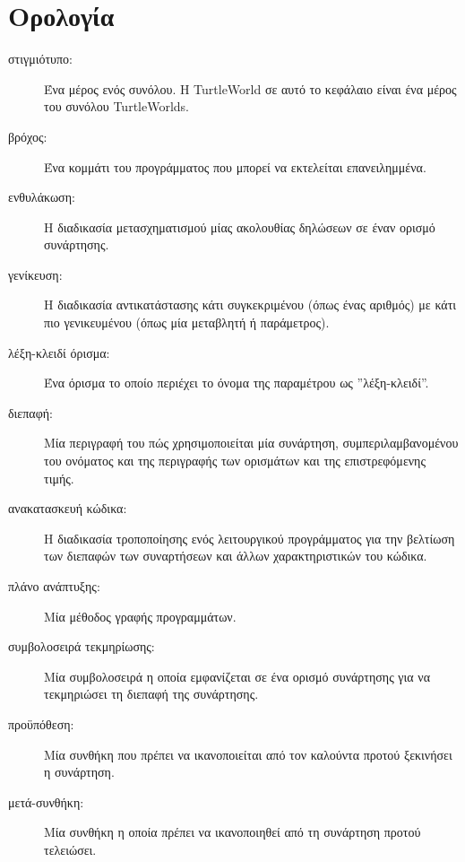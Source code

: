 \documentclass[10pt]{book}
\begin{document}
\section{Ορολογία}

\begin{description}

\item[στιγμιότυπο:] Ένα μέρος ενός συνόλου. Η TurtleWorld σε αυτό το κεφάλαιο
είναι ένα μέρος του συνόλου TurtleWorlds.


\item[βρόχος:] Ένα κομμάτι του προγράμματος που μπορεί να εκτελείται επανειλημμένα.

\item[ενθυλάκωση:] Η διαδικασία μετασχηματισμού μίας ακολουθίας δηλώσεων σε έναν ορισμό συνάρτησης.

\item[γενίκευση:] Η διαδικασία αντικατάστασης κάτι συγκεκριμένου 
(όπως ένας αριθμός) με κάτι πιο γενικευμένου (όπως μία μεταβλητή ή παράμετρος).

\item[λέξη-κλειδί όρισμα:] Ένα όρισμα το οποίο περιέχει το όνομα της παραμέτρου ως ''λέξη-κλειδί''.

\item[διεπαφή:] Μία περιγραφή του πώς χρησιμοποιείται μία συνάρτηση, συμπεριλαμβανομένου του ονόματος και της περιγραφής των ορισμάτων και της επιστρεφόμενης τιμής.

\item[ανακατασκευή κώδικα:] Η διαδικασία τροποποίησης ενός λειτουργικού προγράμματος για την βελτίωση των διεπαφών των συναρτήσεων και άλλων χαρακτηριστικών του κώδικα.

\item[πλάνο ανάπτυξης:] Μία μέθοδος γραφής προγραμμάτων.

\item[συμβολοσειρά τεκμηρίωσης:] Μία συμβολοσειρά η οποία εμφανίζεται σε ένα ορισμό συνάρτησης για να τεκμηριώσει τη διεπαφή της συνάρτησης.

\item[προϋπόθεση:] Μία συνθήκη που πρέπει να ικανοποιείται από τον καλούντα προτού ξεκινήσει η συνάρτηση.

\item[μετά-συνθήκη:] Μία συνθήκη η οποία πρέπει να ικανοποιηθεί από τη συνάρτηση προτού τελειώσει.

\end{description}
\end{document}
